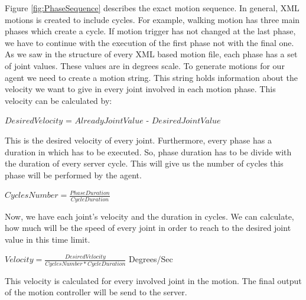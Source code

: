 Figure \ref{fig:PhaseSequence} describes the exact motion sequence. In general, XML motions is created to include cycles. For example, walking motion has three main phases which create a cycle. If motion trigger has not changed at the last phase, we have to continue with the execution of the first phase not with the final one. As we saw in the structure of every XML based motion file, each phase has a set of joint values. These values are in degrees scale. To generate motions for our agent we need to create a motion string. This string holds information about the velocity we want to give in every joint involved in each motion phase. This velocity can be calculated by:
\begin{center}
$Desired Velocity$ = $Already Joint Value$ - $Desired Joint Value$
\end{center}
This is the desired velocity of every joint. Furthermore, every phase has a duration in which has to be executed. So, phase duration has to be divide with the duration of every server cycle. This will give us the number of cycles this phase will be performed by the agent.
\begin{center}
$Cycles Number = \frac {Phase Duration} {Cycle Duration}$
\end{center}
Now, we have each joint's velocity and the duration in cycles. We can calculate, how much will be the speed of every joint in order to reach to the desired joint value in this time limit.
\begin{center}
$Velocity = \frac {Desired Velocity} {Cycles Number \ast CycleDuration} $ Degrees/Sec
\end{center}
This velocity is calculated for every involved joint in the motion. The final output of the motion controller will be send to the server.


